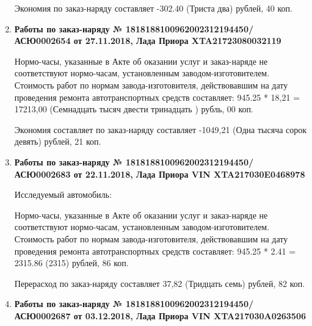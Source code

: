 \begin{enumerate}
Экономия по заказ-наряду составляет -302.40 (Триста два) рублей, 40 коп.  
\vspace{3mm}





\item \par\textbf{{Работы по заказ-наряду  № 1818188100962002312194450/\-АСЮ0002654 от 27.11.2018, Лада Приора XTA21723080032119
}}


Нормо-часы, указанные в Акте об оказании услуг и заказ-наряде не соответствуют нормо-часам,  установленным заводом-изготовителем.\\
Стоимость работ по нормам завода-изготовителя, действовавшим на дату проведения ремонта автотранспортных средств составляет: 945.25 * 18,21  = 17213,00 (Семнадцать тысяч двести тринадцать ) рубль, 00 коп.

Экономия составляет по заказ-наряду составляет -1049,21 (Одна тысяча сорок девять) рублей, 21 коп.  
\vspace{3mm}


\item \par\textbf{{Работы по заказ-наряду   № 1818188100962002312194450/\-АСЮ0002683 от 22.11.2018, Лада Приора  VIN XTA217030E0468978
}}


Исследуемый автомобиль:  




Нормо-часы, указанные в Акте об оказании услуг и заказ-наряде не соответствуют нормо-часам,  установленным заводом-изготовителем.\\
Стоимость работ по нормам завода-изготовителя, действовавшим на дату проведения ремонта автотранспортных средств составляет: 945.25 * 2.41  = 2315.86 (2315) рублей, 86 коп.

Перерасход  по заказ-наряду составляет 37,82 (Тридцать семь) рублей, 82 коп.  
\vspace{3mm}








\item \par\textbf{{Работы по заказ-наряду   № 1818188100962002312194450/\-АСЮ0002687 от 03.12.2018, Лада Приора  VIN  XTA217030A0263506
}}


\end{enumerate}
